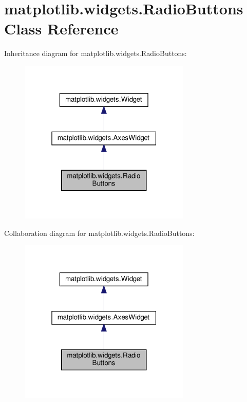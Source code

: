 \hypertarget{classmatplotlib_1_1widgets_1_1RadioButtons}{}\section{matplotlib.\+widgets.\+Radio\+Buttons Class Reference}
\label{classmatplotlib_1_1widgets_1_1RadioButtons}


Inheritance diagram for matplotlib.\+widgets.\+Radio\+Buttons\+:
\nopagebreak
\begin{figure}[H]
\begin{center}
\leavevmode
\includegraphics[width=232pt]{classmatplotlib_1_1widgets_1_1RadioButtons__inherit__graph}
\end{center}
\end{figure}


Collaboration diagram for matplotlib.\+widgets.\+Radio\+Buttons\+:
\nopagebreak
\begin{figure}[H]
\begin{center}
\leavevmode
\includegraphics[width=232pt]{classmatplotlib_1_1widgets_1_1RadioButtons__coll__graph}
\end{center}
\end{figure}
